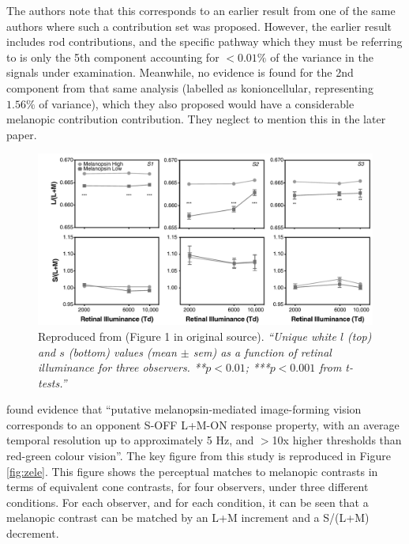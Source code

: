 The authors note that this corresponds to an earlier result from one of the same authors \citep{barrionuevo_contributions_2014} where such a contribution set was proposed. However, the earlier result includes rod contributions, and the specific pathway which they must be referring to is only the 5th component accounting for $<0.01\%$ of the variance in the signals under examination. Meanwhile, no evidence is found for the 2nd component from that same analysis (labelled as konioncellular, representing $1.56\%$ of variance), which they also proposed would have a considerable melanopic contribution contribution. They neglect to mention this in the later paper.

\begin{figure}[htbp]
\includegraphics[max width=\textwidth, center]{figs/LitRev/cao.png}
\caption{Reproduced from \citet{cao_evidence_2018} (Figure 1 in original source). \textit{``Unique white $l$ (top) and $s$ (bottom) values (mean $\pm$ sem)
as a function of retinal illuminance for three observers. **$p < 0.01$;
***$p < 0.001$ from t-tests.''}}
\label{fig:cao}
\end{figure}

\textbf{\citet{zele_melanopsin_2018}} found evidence that ``putative melanopsin-mediated image-forming vision corresponds to an opponent S-OFF L+M-ON response property, with an average temporal resolution up to approximately 5 Hz, and $>$10x higher thresholds than red-green colour vision''. The key figure from this study is reproduced in Figure \ref{fig:zele}. This figure shows the perceptual matches to melanopic contrasts in terms of equivalent cone contrasts, for four observers, under three different conditions. For each observer, and for each condition, it can be seen that a melanopic contrast can be matched by an L+M increment and a S/(L+M) decrement.

